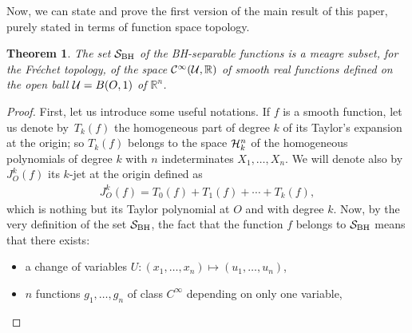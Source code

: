 \documentclass[pdftex]{sigma}%
\numberwithin{equation}{section}
\newtheorem{Theorem}{Theorem}[section]
\begin{document}
Now, we can state and prove the first version of the main result of this paper, purely stated in terms of function space topology.

\begin{Theorem}\label{mainthm}	
	The set ${\cal S}_{\rm BH}$ of the BH-separable functions is a meagre subset, for the Fr\'echet topology, of the space ${\cal C}^{\infty}({\cal U},\mathbb{R})$ of smooth real functions defined on the open ball ${\cal U}=B(O,1)$ of $\mathbb{R}^n$.
	
\end{Theorem}
\begin{proof} First, let us introduce some useful notations. If $f$ is a smooth function, let us denote by~$T_k(f)$ the homogeneous part of degree $k$ of its Taylor's expansion at the origin; so $T_k(f)$ belongs to the space ${\cal H}_k^n$ of the homogeneous polynomials of degree $k$ with $n$ indeterminates $X_1,\dots,X_n$. We will denote also by $J_O^k(f)$ its $k$-jet at the origin defined as
\begin{gather*}J_O^k(f)=T_0(f)+T_1(f)+\cdots+T_k(f),\end{gather*}
	which is nothing but its Taylor polynomial at $O$ and with degree $k$.
	Now, by the very definition of the set ${\cal S}_{\rm BH}$, the fact that the function $f$ belongs to ${\cal S}_{\rm BH}$ means that there exists:
\begin{itemize}\itemsep=0pt
\item a change of variables $U \colon (x_1, \dots, x_n)\mapsto (u_1, \dots, u_n)$,
	
\item $n$ functions $g_1, \dots, g_n$ of class $C^\infty$ depending on only one variable,
	

\end{itemize}
\end{proof}
\end{document}
